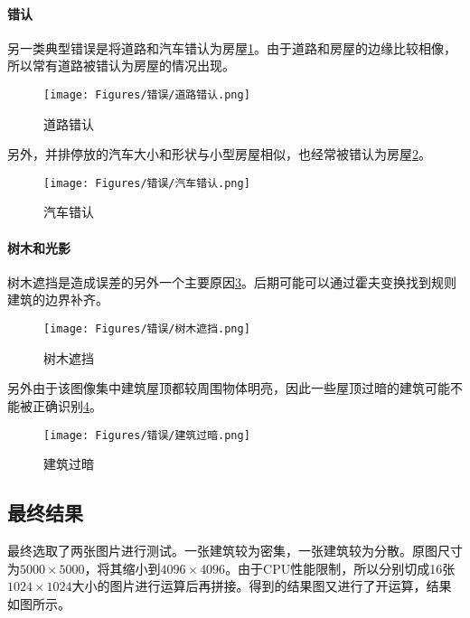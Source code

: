 \paragraph{错认}
另一类典型错误是将道路和汽车错认为房屋\ref{Fig:error_road}。由于道路和房屋的边缘比较相像，所以常有道路被错认为房屋的情况出现。
\begin{figure}[!t]
    \centering
    \texttt{[image: Figures/错误/道路错认.png]}
    \caption{道路错认}
    \label{Fig:error_road}
\end{figure}
另外，并排停放的汽车大小和形状与小型房屋相似，也经常被错认为房屋\ref{Fig:error_car}。
\begin{figure}[!t]
    \centering
    \texttt{[image: Figures/错误/汽车错认.png]}
    \caption{汽车错认}
    \label{Fig:error_car}
\end{figure}
\paragraph{树木和光影}
树木遮挡是造成误差的另外一个主要原因\ref{Fig:tree_error}。后期可能可以通过霍夫变换找到规则建筑的边界补齐。
\begin{figure}[!t]
    \centering
    \texttt{[image: Figures/错误/树木遮挡.png]}
    \caption{树木遮挡}
    \label{Fig:tree_error}
\end{figure}
另外由于该图像集中建筑屋顶都较周围物体明亮，因此一些屋顶过暗的建筑可能不能被正确识别\ref{Fig:dark_building}。
\begin{figure}[!t]
    \centering
    \texttt{[image: Figures/错误/建筑过暗.png]}
    \caption{建筑过暗}
    \label{Fig:dark_building}
\end{figure}
\subsection{最终结果}
最终选取了两张图片进行测试。一张建筑较为密集，一张建筑较为分散。原图尺寸为$5000\times 5000$，将其缩小到$4096\times 4096$。由于CPU性能限制，所以分别切成16张$1024\times1024$大小的图片进行运算后再拼接。得到的结果图又进行了开运算，结果如图所示。
